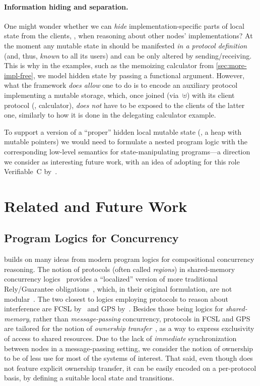 \paragraph{Information hiding and separation.~}

One might wonder whether we can \emph{hide} implementation-specific
parts of local state from the clients, \eg, when reasoning about other
nodes' implementations?
%
At the moment any mutable state in \disel should be manifested
\emph{in a protocol definition} (and, thus, \emph{known} to all its
users) and can be only altered by sending/receiving. This is why in
the examples, such as the memoizing calculator from
\cref{sec:more-impl-free}, we model hidden state by passing a
functional argument. However, what the framework \emph{does allow} one
to do is to encode an auxiliary protocol implementing a mutable
storage, which, once joined (via~$\uplus$) with its client protocol
(\eg, calculator), \emph{does not} have to be exposed to the clients
of the latter one, similarly to how it is done in the delegating
calculator example.

To support a version of a ``proper'' hidden local mutable state (\ie,
a heap with mutable pointers) we would need to formulate a nested
program logic with the corresponding low-level semantics for
state-manipulating programs---a direction we consider as interesting
future work, with an idea of adopting for this role Verifiable~C
by~\citet{Appel-al:BOOK14}.


\section{Related and Future Work}
\label{sec:related}

\subsection{Program Logics for Concurrency}

\disel builds on many ideas from modern program logics for
compositional concurrency reasoning.
%
The notion of protocols (often called \emph{regions}) in shared-memory
concurrency
logics~\cite{Turon-al:POPL13,DinsdaleYoung-al:ECOOP10,Nanevski-al:ESOP14,Turon-al:OOPSLA14,Raad-al:ESOP15,Svendsen-Birkedal:ESOP14}
provides a ``localized'' version of more traditional Rely/Guarantee
obligations~\cite{Jones:TOPLAS83}, which, in their original
formulation, are not
modular~\cite{Vafeiadis-Parkinson:CONCUR07,Feng:POPL09,Feng-al:ESOP07}.
%
The two closest to \disel logics employing protocols to reason about
interference are FCSL by~\citet{Nanevski-al:ESOP14} and GPS
by~\citet{Turon-al:OOPSLA14}. Besides those being logics for
\emph{shared-memory}, rather than \emph{message-passing} concurrency,
protocols in FCSL and GPS are tailored for the notion of
\emph{ownership transfer}~\cite{OHearn:TCS07}, as a way to express
exclusivity of access to shared resources.
%
Due to the lack of \emph{immediate} synchronization between nodes in a
message-passing setting, we consider the notion of ownership to be of
less use for most of the systems of interest. That said, even though
\disel does not feature explicit ownership transfer, it can be easily
encoded on a per-protocol basis, by defining a suitable local state
and transitions.

